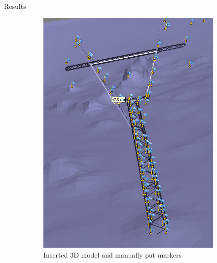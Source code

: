\documentclass{beamer}
\begin{document}
\begin{frame}[t, fragile]{Results}
\begin{figure}
\centering
\begin{subfigure}{.5\textwidth}
\centering
\includegraphics[scale=0.15]{results_cool}
\caption{Inserted 3D model and manually put markers}
\end{subfigure}%
\begin{subfigure}{.5\textwidth}
\centering

\end{subfigure}
\end{figure}
\end{frame}
\end{document}
